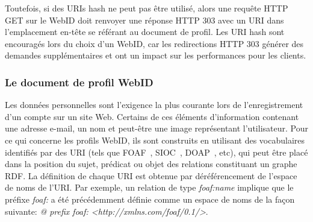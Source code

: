 \documentclass[a4paper]{article}
\begin{document}
Toutefois, si des URIs hash ne peut pas être utilisé, alors une requête HTTP GET sur le WebID doit renvoyer une réponse HTTP 303 avec un URI dans l'emplacement en-tête se référant au document de profil. Les URI hash sont encouragés lors du choix d'un WebID, car les redirections HTTP 303 générer des demandes supplémentaires et ont un impact sur les performances pour les clients.

\subsubsection{Le document de profil WebID}
\label{subsec:webid_profile}
Les données personnelles sont l'exigence la plus courante lors de l'enregistrement d'un compte sur un site Web. Certains de ces éléments d'information contenant une adresse e-mail, un nom et peut-être une image représentant l'utilisateur. Pour ce qui concerne les profils WebID, ils sont construits en utilisant des vocabulaires identifiés par des URI (tels que FOAF~\cite{foaf}, SIOC~\cite{breslin2005towards}, DOAP~\cite{dumbill2012doap}, etc), qui peut être placé dans la position du sujet, prédicat ou objet des relations constituant un graphe RDF. La définition de chaque URI est obtenue par déréférencement de l'espace de noms de l'URI. Par exemple, un relation de type \textit{foaf:name} implique que le préfixe \textit{foaf:} a été précédemment définie comme un espace de noms de la façon suivante: \textit{@ prefix foaf: <http://xmlns.com/foaf/0.1/>}.\\
\end{document}
